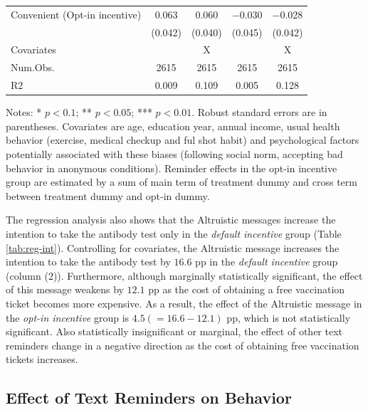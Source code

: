 \documentclass[
]{article}
\begin{document}
\begin{table}
\begin{threeparttable}
\begin{tabular}[t]{lcccc}
\hspace{1em}Convenient (Opt-in incentive) & \num{0.063} & \num{0.060} & \num{-0.030} & \num{-0.028}\\
\hspace{1em} & (\num{0.042}) & (\num{0.040}) & (\num{0.045}) & (\num{0.042})\\
\midrule
Covariates &  & X &  & X\\
Num.Obs. & \num{2615} & \num{2615} & \num{2615} & \num{2615}\\
R2 & \num{0.009} & \num{0.109} & \num{0.005} & \num{0.128}\\
\bottomrule
\end{tabular}
\begin{tablenotes}
\item Notes: * $p < 0.1$; ** $p < 0.05$; *** $p < 0.01$. Robust standard errors are in parentheses. Covariates are age, education year, annual income, usual health behavior (exercise, medical checkup and ful shot habit) and psychological factors potentially associated with these biases (following social norm, accepting bad behavior in anonymous conditions). Reminder effects in the opt-in incentive group are estimated by a sum of main term of treatment dummy and cross term between treatment dummy and opt-in dummy.
\end{tablenotes}
\end{threeparttable}
\end{table}

The regression analysis also shows that the Altruistic messages increase the intention to take the antibody test only in the \emph{default incentive} group (Table \ref{tab:reg-int}). Controlling for covariates, the Altruistic message increases the intention to take the antibody test by \(16.6\) pp in the \emph{default incentive} group (column (2)). Furthermore, although marginally statistically significant, the effect of this message weakens by \(12.1\) pp as the cost of obtaining a free vaccination ticket becomes more expensive. As a result, the effect of the Altruistic message in the \emph{opt-in incentive} group is \(4.5 (=16.6-12.1)\) pp, which is not statistically significant. Also statistically insignificant or marginal, the effect of other text reminders change in a negative direction as the cost of obtaining free vaccination tickets increases.

\hypertarget{behavior}{%
\subsection{Effect of Text Reminders on Behavior}\label{behavior}}
\end{document}
